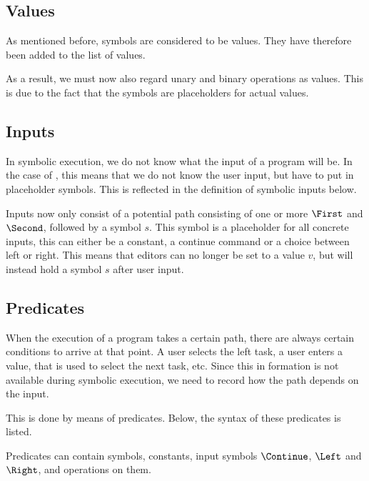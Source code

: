 
\subsection{Values}

As mentioned before, symbols are considered to be values.
They have therefore been added to the list of values.


As a result, we must now also regard unary and binary operations as values.
This is due to the fact that the symbols are placeholders for actual values.



\subsection{Inputs}

In symbolic execution, we do not know what the input of a program will be.
In the case of \TOPHAT, this means that we do not know the user input, but have to put in placeholder symbols.
This is reflected in the definition of symbolic inputs below.


Inputs now only consist of a potential path consisting of one or more $\First$ and $\Second$,
followed by a symbol $s$.
This symbol is a placeholder for all concrete inputs, this can either be a constant, a continue command or a choice between left or right.
This means that editors can no longer be set to a value $v$, but will instead hold a symbol $s$ after user input.


\subsection{Predicates}

When the execution of a \TOPHAT program takes a certain path, there are always certain conditions to arrive at that point.
A user selects the left task, a user enters a value, that is used to select the next task, etc.
Since this in formation is not available during symbolic execution, we need to record how the path depends on the input.

This is done by means of predicates.
Below, the syntax of these predicates is listed.


Predicates can contain symbols, constants, input symbols $\Continue$, $\Left$ and $\Right$, and operations on them.
